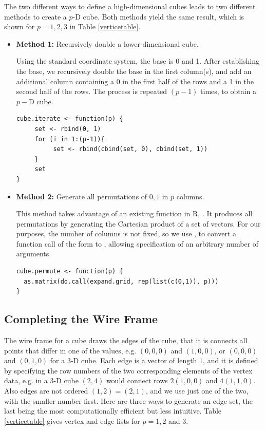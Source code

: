 \documentclass[article]{jss}
\begin{document}
The two different ways to define a high-dimensional cubes leads to two
different methods to create a $p$-D cube. Both methods yield the same
result, which is shown for $p=1,2,3$ in Table \ref{verticetable}.

\begin{itemize}

  \item {\bf Method 1:} Recursively double a lower-dimensional cube.
 
    Using the standard coordinate system, the base is 0 and 1. After
    establishing the base, we recursively double the base in the first
    column(s), and add an additional column containing a 0 in the
    first half of the rows and a 1 in the second half of the rows. The
    process is repeated $(p-1)$ times, to obtain a $p-$D cube.

\begin{verbatim}
cube.iterate <- function(p) {
     set <- rbind(0, 1)
     for (i in 1:(p-1)){
          set <- rbind(cbind(set, 0), cbind(set, 1))
     }
     set
} 
\end{verbatim}

  \item {\bf Method 2:} Generate all permutations of ${0, 1}$ in $p$ columns.
  
    This method takes advantage of an existing function in R,
    . It produces all permutations by generating the
    Cartesian product of a set of vectors. For our purposes, the
    number of columns is not fixed, so we use , to
    convert a function call of the form  to
    , allowing specification of an
    arbitrary number of arguments.

  \begin{verbatim}
cube.permute <- function(p) {
  as.matrix(do.call(expand.grid, rep(list(c(0,1)), p)))
}
\end{verbatim}
\end{itemize}

\subsection{Completing the Wire Frame}

The wire frame for a cube draws the edges of the cube, that it is
connects all points that differ in one of the values, e.g. $(0,0,0)$
and $(1,0,0)$, or $(0,0,0)$ and $(0,1,0)$ for a 3-D cube. Each edge is
a vector of length $1$, and it is defined by specifying the row
numbers of the two corresponding elements of the vertex data, e.g. in
a 3-D cube $(2,4)$ would connect rows $2 (1,0,0)$ and $4
(1,1,0)$. Also edges are not ordered $(1,2)=(2,1)$, and we use just
one of the two, with the smaller number first. Here are three ways to
generate an edge set, the last being the most computationally
efficient but less intuitive. Table \ref{verticetable} gives vertex
and edge lists for $p=1, 2$ and $3$.
\end{document}
